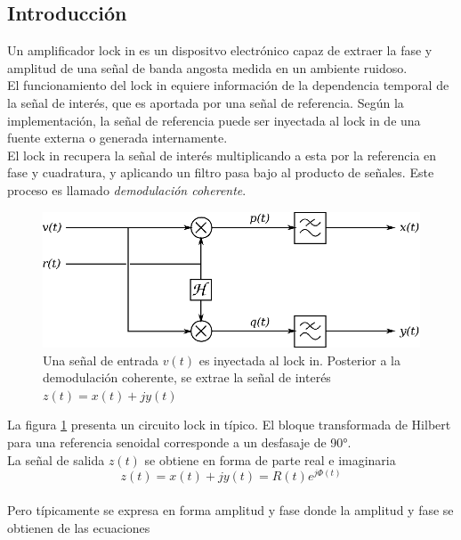 \documentclass[11pt,a4paper]{extarticle}
\begin{document}
\begin{multicols}{2}
\section{Introducción}

Un amplificador lock in es un dispositvo electrónico capaz de extraer la fase y amplitud de una señal de banda angosta medida en un ambiente ruidoso.\\

El funcionamiento del lock in equiere información de la dependencia temporal de la señal de interés, que es aportada por una señal de referencia. Según la implementación, la señal de referencia puede ser inyectada al lock in de una fuente externa o generada internamente.\\ 

El lock in recupera la señal de interés multiplicando a esta por la referencia en fase y cuadratura, y aplicando un filtro pasa bajo al producto de señales. Este proceso es llamado \textit{demodulación coherente}. \cite{zurich}\\

\begin{figure}[H]
	\centering
	\includegraphics[width=\linewidth]{Images/lockin_gral.eps}
	\caption{Una señal de entrada $v(t)$ es inyectada al lock in. Posterior a la demodulación coherente, se extrae la señal de interés $z(t)=x(t)+jy(t)$}
	\label{fig:lockin}
\end{figure}

La figura \ref{fig:lockin} presenta un circuito lock in típico. El bloque transformada de Hilbert para una referencia senoidal corresponde a un desfasaje de 90°.\\

La señal de salida $z(t)$ se obtiene en forma de parte real e imaginaria
\begin{equation*}
	z(t) = x(t) + j y(t) = R(t) e ^{j\Phi(t)}
\end{equation*}\\[-1em]
Pero típicamente se expresa en forma amplitud y fase donde la amplitud y fase se obtienen de las ecuaciones


\end{multicols}
\end{document}
